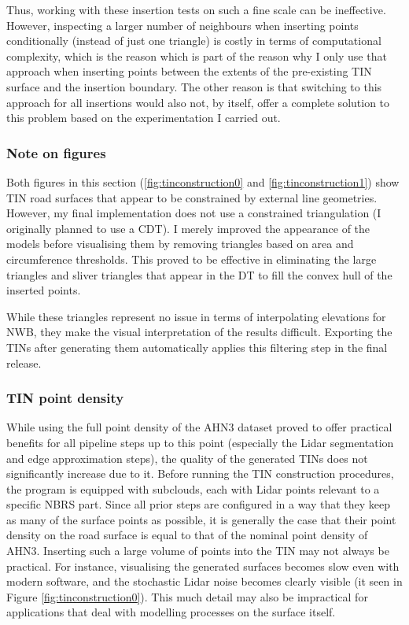 Thus, working with these insertion tests on such a fine scale can be ineffective. However, inspecting a larger number of neighbours when inserting points conditionally (instead of just one triangle) is costly in terms of computational complexity, which is the reason which is part of the reason why I only use that approach when inserting points between the extents of the pre-existing TIN surface and the insertion boundary. The other reason is that switching to this approach for all insertions would also not, by itself, offer a complete solution to this problem based on the experimentation I carried out.

\subsubsection{Note on figures}

Both figures in this section (\ref{fig:tinconstruction0} and \ref{fig:tinconstruction1}) show TIN road surfaces that appear to be constrained by external line geometries. However, my final implementation does not use a constrained triangulation (I originally planned to use a CDT). I merely improved the appearance of the models before visualising them by removing triangles based on area and circumference thresholds. This proved to be effective in eliminating the large triangles and sliver triangles that appear in the DT to fill the convex hull of the inserted points.

While these triangles represent no issue in terms of interpolating elevations for NWB, they make the visual interpretation of the results difficult. Exporting the TINs after generating them automatically applies this filtering step in the final release.

\subsubsection{TIN point density}

While using the full point density of the AHN3 dataset proved to offer practical benefits for all pipeline steps up to this point (especially the Lidar segmentation and edge approximation steps), the quality of the generated TINs does not significantly increase due to it. Before running the TIN construction procedures, the program is equipped with subclouds, each with Lidar points relevant to a specific NBRS part. Since all prior steps are configured in a way that they keep as many of the surface points as possible, it is generally the case that their point density on the road surface is equal to that of the nominal point density of AHN3. Inserting such a large volume of points into the TIN may not always be practical. For instance, visualising the generated surfaces becomes slow even with modern software, and the stochastic Lidar noise becomes clearly visible (it seen in Figure \ref{fig:tinconstruction0}). This much detail may also be impractical for applications that deal with modelling processes on the surface itself.


